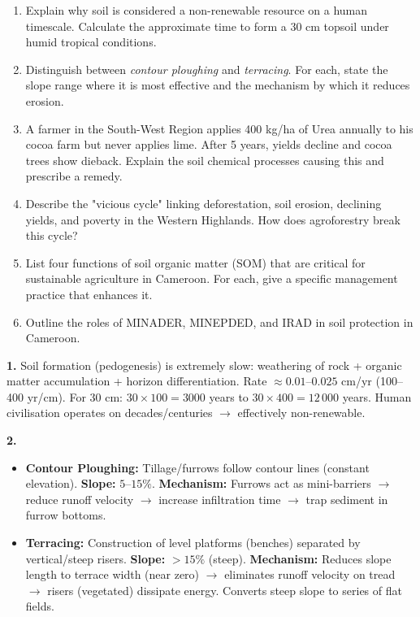 \documentclass[11pt]{article}
\begin{document}
\begin{exercice}
\begin{enumerate}
    \item Explain why soil is considered a non-renewable resource on a human timescale. Calculate the approximate time to form a 30 cm topsoil under humid tropical conditions.
    \item Distinguish between \emph{contour ploughing} and \emph{terracing}. For each, state the slope range where it is most effective and the mechanism by which it reduces erosion.
    \item A farmer in the South-West Region applies 400 kg/ha of Urea annually to his cocoa farm but never applies lime. After 5 years, yields decline and cocoa trees show dieback. Explain the soil chemical processes causing this and prescribe a remedy.
    \item Describe the "vicious cycle" linking deforestation, soil erosion, declining yields, and poverty in the Western Highlands. How does agroforestry break this cycle?
    \item List four functions of soil organic matter (SOM) that are critical for sustainable agriculture in Cameroon. For each, give a specific management practice that enhances it.
    \item Outline the roles of MINADER, MINEPDED, and IRAD in soil protection in Cameroon.
\end{enumerate}
\end{exercice}

\begin{corrige}[Exercise 1]
\textbf{1.} Soil formation (pedogenesis) is extremely slow: weathering of rock + organic matter accumulation + horizon differentiation. Rate $\approx 0.01–0.025$ cm/yr (100–400 yr/cm). For 30 cm: $30 \times 100 = 3000$ years to $30 \times 400 = 12\,000$ years. Human civilisation operates on decades/centuries $\rightarrow$ effectively non-renewable.
\end{corrige}

\begin{corrige}[Exercise 2]
\textbf{2.}
\begin{itemize}
    \item \textbf{Contour Ploughing:} Tillage/furrows follow contour lines (constant elevation). \textbf{Slope:} $5–15\%$. \textbf{Mechanism:} Furrows act as mini-barriers $\rightarrow$ reduce runoff velocity $\rightarrow$ increase infiltration time $\rightarrow$ trap sediment in furrow bottoms.
    \item \textbf{Terracing:} Construction of level platforms (benches) separated by vertical/steep risers. \textbf{Slope:} $> 15\%$ (steep). \textbf{Mechanism:} Reduces slope length to terrace width (near zero) $\rightarrow$ eliminates runoff velocity on tread $\rightarrow$ risers (vegetated) dissipate energy. Converts steep slope to series of flat fields.
\end{itemize}
\end{corrige}
\end{document}
